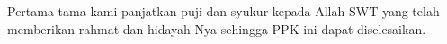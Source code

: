 \begin{acknowledgements}
Pertama-tama kami panjatkan puji dan syukur kepada Allah SWT yang telah memberikan rahmat dan hidayah-Nya sehingga PPK ini dapat diselesaikan.
\end{acknowledgements}